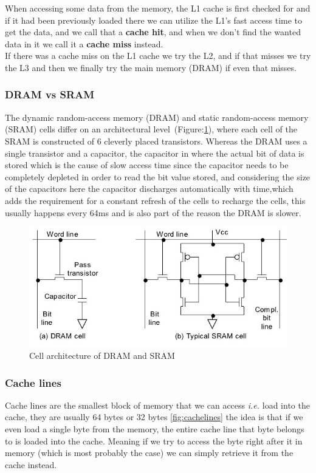 \documentclass {article}
\begin{document}
When accessing some data from the memory, the L1 cache is first checked for and
if it had been previously loaded there we can utilize the L1's fast access time
to get the data, and we call that a \textbf{cache hit}, and when we don't find the
wanted data in it we call it a \textbf{cache miss} instead.\\

If there was a cache miss on the L1 cache we try the L2, and if that misses we
try the L3 and then we finally try the main memory (DRAM) if even that misses.

\subsubsection{DRAM vs SRAM}
The dynamic random-access memory (DRAM) and static random-access memory (SRAM)
cells differ on an architectural level (Figure:\ref{fig:dramsram}), where each 
cell of the SRAM is constructed of 6 cleverly placed transistors. Whereas the DRAM
uses a single transistor and a capacitor, the capacitor in where the actual bit of
data is stored which is the cause of slow access time since the capacitor needs
to be completely depleted in order to read the bit value stored, and considering
the size of the capacitors here the capacitor discharges automatically with
time,which adds the requirement for a constant refresh of the cells to recharge
the cells, this usually happens every 64ms and is also part of the reason the
DRAM is slower. \cite{dramsram:1}

\begin{figure}[H]
    \includegraphics[width=\linewidth]{plot/dram_sram.jpg}
    \caption{Cell architecture of DRAM and SRAM}
    \label{fig:dramsram}
\end{figure}

\subsubsection{Cache lines}
Cache lines are the smallest block of memory that we can access \textit{i.e.}
load into the cache, they are usually 64 bytes or 32 bytes \ref{fig:cachelines}
the idea is that if we even load a single byte from the memory, the entire
cache line that byte belongs to is loaded into the cache. Meaning if we try
to access the byte right after it in memory (which is most probably the case)
we can simply retrieve it from the cache instead.\\
\end{document}
